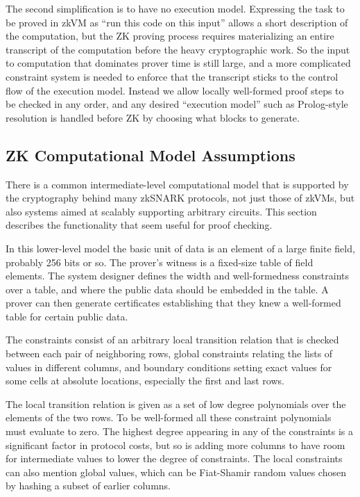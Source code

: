 \documentclass{article}
\theoremstyle{plain}
\theoremstyle{definition}
\begin{document}
The second simplification is to have no execution model.
Expressing the task to be proved in zkVM as ``run this code on this input'' allows a short description of the computation, but the ZK proving process requires materializing an entire transcript of the computation before the heavy cryptographic work.
So the input to computation that dominates prover time is still large, and a more complicated constraint system is needed to enforce that the transcript sticks to the control flow of the execution model.
Instead we allow locally well-formed proof steps to be checked in any order, and any desired ``execution model'' such as Prolog-style resolution is handled before ZK by choosing what blocks to generate.

\subsection{ZK Computational Model Assumptions}\label{zk-computational-model-assumptions}


There is a common intermediate-level computational model that is
supported by the cryptography behind many zkSNARK protocols, not just
those of zkVMs, but also systems aimed at scalably supporting arbitrary
circuits. This section describes the functionality that seem useful for
proof checking.

In this lower-level model the basic unit of data is an element of a
large finite field, probably 256 bits or so. The prover's witness is a
fixed-size table of field elements. The system designer defines the
width and well-formedness constraints over a table, and where the public
data should be embedded in the table. A prover can then generate
certificates establishing that they knew a well-formed table for certain
public data.

The constraints consist of an arbitrary local transition relation that
is checked between each pair of neighboring rows, global constraints
relating the lists of values in different columns, and boundary
conditions setting exact values for some cells at absolute locations,
especially the first and last rows.

The local transition relation is given as a set of low degree
polynomials over the elements of the two rows. To be well-formed all
these constraint polynomials must evaluate to zero. The highest degree
appearing in any of the constraints is a significant factor in protocol
costs, but so is adding more columns to have room for intermediate
values to lower the degree of constraints. The local constraints can
also mention global values, which can be Fiat-Shamir random values
chosen by hashing a subset of earlier columns.
\end{document}
